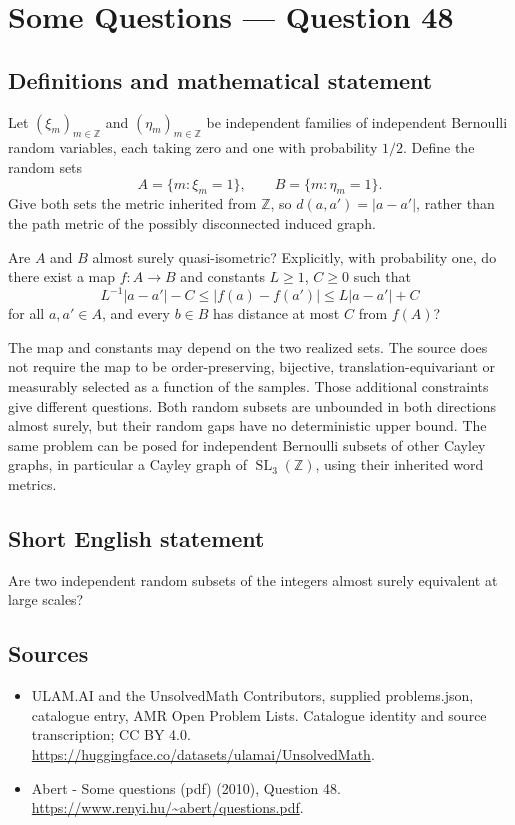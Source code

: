 \documentclass[11pt,a4paper]{article}
\begin{document}
\section*{Some Questions — Question 48}\label{statement}

\subsection{Definitions and mathematical statement}
Let $(\xi_m)_{m\in\mathbb Z}$ and $(\eta_m)_{m\in\mathbb Z}$ be independent families of independent Bernoulli random variables, each taking zero and one with probability $1/2$. Define the random sets
\[
 A=\{m:\xi_m=1\},\qquad B=\{m:\eta_m=1\}.
\]
Give both sets the metric inherited from $\mathbb Z$, so $d(a,a')=|a-a'|$, rather than the path metric of the possibly disconnected induced graph.

Are $A$ and $B$ almost surely quasi-isometric? Explicitly, with probability one, do there exist a map $f:A\to B$ and constants $L\geq1$, $C\geq0$ such that
\[
 L^{-1}|a-a'|-C\leq |f(a)-f(a')|\leq L|a-a'|+C
\]
for all $a,a'\in A$, and every $b\in B$ has distance at most $C$ from $f(A)$?

The map and constants may depend on the two realized sets. The source does not require the map to be order-preserving, bijective, translation-equivariant or measurably selected as a function of the samples. Those additional constraints give different questions. Both random subsets are unbounded in both directions almost surely, but their random gaps have no deterministic upper bound. The same problem can be posed for independent Bernoulli subsets of other Cayley graphs, in particular a Cayley graph of $\operatorname{SL}_3(\mathbb Z)$, using their inherited word metrics.
\subsection{Short English statement}
Are two independent random subsets of the integers almost surely equivalent at large scales?
\subsection{Sources}
\begin{itemize}
\item[S1] ULAM.AI and the UnsolvedMath Contributors, supplied problems.json, catalogue entry, AMR Open Problem Lists. Catalogue identity and source transcription; CC BY 4.0.
\url{https://huggingface.co/datasets/ulamai/UnsolvedMath}.
\item[S2] Abert - Some questions (pdf) (2010), Question 48. 
\url{https://www.renyi.hu/~abert/questions.pdf}.
\end{itemize}
\end{document}
